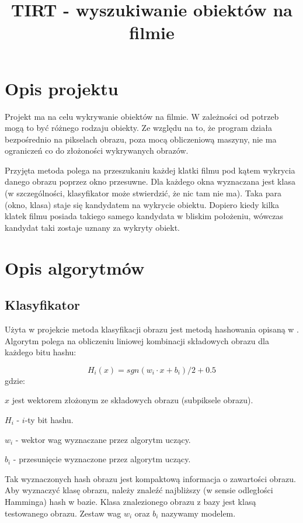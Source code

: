 \documentclass[10pt,a4paper]{article}
\title{TIRT - wyszukiwanie obiektów na filmie}
\date{}
\begin{document}
\maketitle

\section{Opis projektu}

Projekt ma na celu wykrywanie obiektów na filmie. W zależności od potrzeb mogą to być różnego rodzaju obiekty. Ze względu na to, że program działa bezpośrednio na pikselach obrazu, poza mocą obliczeniową maszyny, nie ma ograniczeń co do złożoności wykrywanych obrazów. 

Przyjęta metoda polega na przeszukaniu każdej klatki filmu pod kątem wykrycia danego obrazu poprzez okno przesuwne. Dla każdego okna wyznaczana jest klasa (w szczególności, klasyfikator może stwierdzić, że nic tam nie ma). Taka para (okno, klasa) staje się kandydatem na wykrycie obiektu. Dopiero kiedy kilka klatek filmu posiada takiego samego kandydata w bliskim położeniu, wówczas kandydat taki zostaje uznany za wykryty obiekt.

\section{Opis algorytmów}

\subsection{Klasyfikator}

Użyta w projekcie metoda klasyfikacji obrazu jest metodą hashowania opisaną w \cite{splh}. Algorytm polega na obliczeniu liniowej kombinacji składowych obrazu dla każdego bitu hashu:

\begin{equation} \label{hash_equation}
H_i(x) = sgn(w_i \cdot x + b_i) / 2 + 0.5
\end{equation}
gdzie:

$x$ jest wektorem złożonym ze składowych obrazu (subpiksele obrazu).

$H_i$ - $i$-ty bit hashu. 

$w_i$ - wektor wag wyznaczane przez algorytm uczący.

$b_i$ - przesunięcie wyznaczone przez algorytm uczący.

Tak wyznaczonych hash obrazu jest kompaktową informacja o zawartości obrazu. Aby wyznaczyć klasę obrazu, należy znaleźć najbliższy (w sensie odległości Hamminga) hash w bazie. Klasa znalezionego obrazu z bazy jest klasą testowanego obrazu. Zestaw wag $w_i$ oraz $b_i$ nazywamy modelem.
\end{document}
